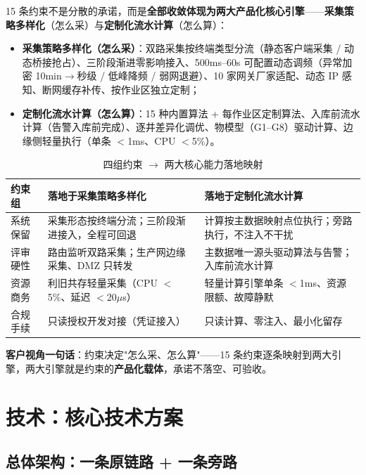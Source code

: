 \documentclass[11pt,a4paper]{ctexart}
\begin{document}
15 条约束不是分散的承诺，而是\textbf{全部收敛体现为两大产品化核心引擎}——\textbf{采集策略多样化}（怎么采）与\textbf{定制化流水计算}（怎么算）：

\begin{itemize}[leftmargin=*]
  \item \textbf{采集策略多样化（怎么采）}：双路采集按终端类型分流（静态客户端采集 / 动态桥接抢占）、三阶段渐进零影响接入、500ms--60s 可配置动态调频（异常加密 10min$\rightarrow$秒级 / 低峰降频 / 弱网退避）、10 家网关厂家适配、动态 IP 感知、断网缓存补传、按作业区独立定制；
  \item \textbf{定制化流水计算（怎么算）}：15 种内置算法 + 每作业区定制算法、入库前流水计算（告警入库前完成）、逐井差异化调优、物模型（G1--G8）驱动计算、边缘侧轻量执行（单条 $<$1ms、CPU $<$5\%）。
\end{itemize}

\begin{table}[H]\centering
\caption{四组约束 $\rightarrow$ 两大核心能力落地映射}
\begin{tabular}{p{2.2cm} p{5.8cm} p{5.8cm}}
\toprule
\textbf{约束组} & \textbf{落地于采集策略多样化} & \textbf{落地于定制化流水计算} \\
\midrule
系统保留 & 采集形态按终端分流；三阶段渐进接入，全程可回退 & 计算按主数据映射点位执行；旁路执行，不注入不干扰 \\
评审硬性 & 路由监听双路采集；生产网边缘采集、DMZ 只转发 & 主数据唯一源头驱动算法与告警；入库前流水计算 \\
资源商务 & 利旧共存轻量采集（CPU $<$5\%、延迟 $<$20$\mu$s） & 轻量计算引擎单条 $<$1ms、资源限额、故障静默 \\
合规手续 & 只读授权开发对接（凭证接入） & 只读计算、零注入、最小化留存 \\
\bottomrule
\end{tabular}
\end{table}

\textbf{客户视角一句话}：约束决定"怎么采、怎么算"——15 条约束逐条映射到两大引擎，两大引擎就是约束的\textbf{产品化载体}，承诺不落空、可验收。

\section{技术：核心技术方案}

\subsection{总体架构：一条原链路 + 一条旁路}
\end{document}
